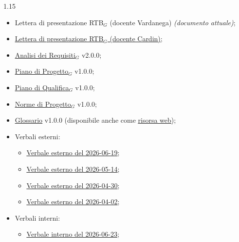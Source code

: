\documentclass[a4paper, 11pt]{article}
\let\orighref\href
\renewcommand{\href}[2]{\orighref{#1}{\uline{#2}}}
\begin{document}
\begin{spacing}{1.15}
\begin{itemize}
    \item Lettera di presentazione RTB$_G$ (docente Vardanega) \textit{(documento attuale)};
    \item \href{https://thebitless.live/RTB/lettera-di-presentazione/lettera-di-presentazione.pdf}{Lettera di presentazione RTB$_G$ (docente Cardin)};
    \item \href{https://thebitless.live/RTB/doc_esterna/analisi-dei-requisiti/analisi-dei-requisiti.pdf}{Analisi dei Requisiti$_G$} v2.0.0;
    \item \href{https://thebitless.live/RTB/doc_esterna/piano-di-progetto/piano-di-progetto.pdf}{Piano di Progetto$_G$} v1.0.0;
    \item \href{https://thebitless.live/RTB/doc_esterna/piano-di-qualifica/piano-di-qualifica.pdf}{Piano di Qualifica$_G$} v1.0.0;
    \item \href{https://thebitless.live/RTB/doc_interna/norme-di-progetto/norme-di-progetto.pdf}{Norme di Progetto$_G$} v1.0.0;
    \item \href{https://thebitless.live/RTB/doc_interna/glossario/glossario.pdf}{Glossario} v1.0.0 (disponibile anche come \href{https://thebitless.live/website/glossario.html}{risorsa web});
    \item Verbali esterni:
    \begin{itemize}
        \item \href{https://thebitless.live/RTB/doc_esterna/verbali/VE_2026-06-19_dimostrazione-poc/VE_2026-06-19_dimostrazione-poc.pdf}{Verbale esterno del 2026-06-19};
        \item \href{https://thebitless.live/RTB/doc_esterna/verbali/VE_2026-05-14_AdR-scelta-tecnologie/VE_2026-05-14_AdR-scelta-tecnologie.pdf}{Verbale esterno del 2026-05-14};
        \item \href{https://thebitless.live/RTB/doc_esterna/verbali/VE_2026-04-30_revisione-casi-uso/VE_2026-04-30_revisione-casi-uso.pdf}{Verbale esterno del 2026-04-30};
        \item \href{https://thebitless.live/RTB/doc_esterna/verbali/VE_2026-04-02_avvio-progettazione/VE_2026-04-02_avvio-progettazione.pdf}{Verbale esterno del 2026-04-02};
    \end{itemize}
    \item Verbali interni:
    \begin{itemize}
        \item \href{https://thebitless.live/RTB/doc_interna/verbali/VI_2026-06-23_settimo-sprint/VI_2026-06-23_settimo-sprint.pdf}{Verbale interno del 2026-06-23};

\end{itemize}
\end{itemize}
\end{spacing}
\end{document}
